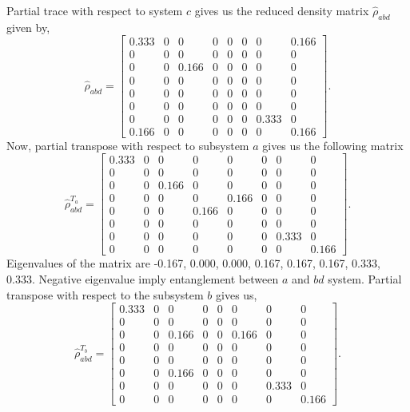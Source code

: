 \documentclass{scrartcl}
\begin{document}
Partial trace with respect to system $c$ gives us the reduced density matrix $\hat{\rho}_{abd}$ given by,
\begin{equation*}
	\hat{\rho}_{abd} = \left[\begin{matrix}0.333 & 0 & 0 & 0 & 0 & 0 & 0 & 0.166\\0 & 0 & 0 & 0 & 0 & 0 & 0 & 0\\0 & 0 & 0.166 & 0 & 0 & 0 & 0 & 0\\0 & 0 & 0 & 0 & 0 & 0 & 0 & 0\\0 & 0 & 0 & 0 & 0 & 0 & 0 & 0\\0 & 0 & 0 & 0 & 0 & 0 & 0 & 0\\0 & 0 & 0 & 0 & 0 & 0 & 0.333 & 0\\0.166 & 0 & 0 & 0 & 0 & 0 & 0 & 0.166\end{matrix}\right].
\end{equation*}
Now, partial transpose with respect to subsystem $a$ gives us the following matrix
\begin{equation*}
	\hat{\rho}^{T_a}_{abd} =\left[\begin{matrix}0.333 & 0 & 0 & 0 & 0 & 0 & 0 & 0\\0 & 0 & 0 & 0 & 0 & 0 & 0 & 0\\0 & 0 & 0.166 & 0 & 0 & 0 & 0 & 0\\0 & 0 & 0 & 0 & 0.166 & 0 & 0 & 0\\0 & 0 & 0 & 0.166 & 0 & 0 & 0 & 0\\0 & 0 & 0 & 0 & 0 & 0 & 0 & 0\\0 & 0 & 0 & 0 & 0 & 0 & 0.333 & 0\\0 & 0 & 0 & 0 & 0 & 0 & 0 & 0.166\end{matrix}\right]	.
\end{equation*}
Eigenvalues of the matrix are -0.167, 0.000, 0.000, 0.167, 0.167, 0.167, 0.333, 0.333. Negative eigenvalue imply entanglement between $a$ and $bd$ system. Partial transpose with respect to the subsystem $b$ gives us,
\begin{equation*}
	\hat{\rho}_{abd}^{T_b} = \left[\begin{matrix}0.333 & 0 & 0 & 0 & 0 & 0 & 0 & 0\\0 & 0 & 0 & 0 & 0 & 0 & 0 & 0\\0 & 0 & 0.166 & 0 & 0 & 0.166 & 0 & 0\\0 & 0 & 0 & 0 & 0 & 0 & 0 & 0\\0 & 0 & 0 & 0 & 0 & 0 & 0 & 0\\0 & 0 & 0.166 & 0 & 0 & 0 & 0 & 0\\0 & 0 & 0 & 0 & 0 & 0 & 0.333 & 0\\0 & 0 & 0 & 0 & 0 & 0 & 0 & 0.166\end{matrix}\right].
\end{equation*}
\end{document}

